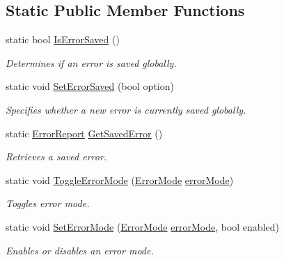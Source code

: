 \subsection*{Static Public Member Functions}
\begin{DoxyCompactItemize}
\item 
static bool \hyperlink{class_error_report_a60d5623dd21ced2f3a41055aab6cae06}{IsErrorSaved} ()
\begin{DoxyCompactList}\small\item\em Determines if an error is saved globally. \item\end{DoxyCompactList}\item 
static void \hyperlink{class_error_report_ad3c1fc3c06e6748657150eb9d7ec6c62}{SetErrorSaved} (bool option)
\begin{DoxyCompactList}\small\item\em Specifies whether a new error is currently saved globally. \item\end{DoxyCompactList}\item 
static \hyperlink{class_error_report}{ErrorReport} \hyperlink{class_error_report_ae60447056cab3846d9d38d3674001567}{GetSavedError} ()
\begin{DoxyCompactList}\small\item\em Retrieves a saved error. \item\end{DoxyCompactList}\item 
static void \hyperlink{class_error_report_a48086a3096dc372308c4fb1a4733e52d}{ToggleErrorMode} (\hyperlink{class_error_report_ab70777b4cf64240281ddd4217664f683}{ErrorMode} \hyperlink{class_error_report_ab43384b89b5e0b6addcde53268d3c578}{errorMode})
\begin{DoxyCompactList}\small\item\em Toggles error mode. \item\end{DoxyCompactList}\item 
static void \hyperlink{class_error_report_a3521dfd94b7c249672b965fc4e50910b}{SetErrorMode} (\hyperlink{class_error_report_ab70777b4cf64240281ddd4217664f683}{ErrorMode} \hyperlink{class_error_report_ab43384b89b5e0b6addcde53268d3c578}{errorMode}, bool enabled)
\begin{DoxyCompactList}\small\item\em Enables or disables an error mode. \item\end{DoxyCompactList}\item 

\end{DoxyCompactItemize}
